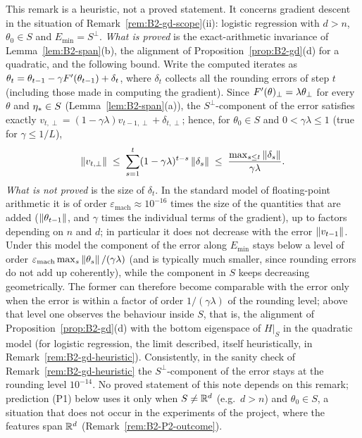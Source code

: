 \begin{remark}\label{rem:B2-gd-rounding}
This remark is a heuristic, not a proved statement. It concerns gradient descent in the situation of
Remark~\ref{rem:B2-gd-scope}(ii): logistic regression with $d>n$, $\theta_0\in S$ and $E_{\min}=S^\perp$. \emph{What is
proved} is the exact-arithmetic invariance of Lemma~\ref{lem:B2-span}(b), the alignment of Proposition~\ref{prop:B2-gd}(d)
for a quadratic, and the following bound. Write the computed iterates as
$\theta_t=\theta_{t-1}-\gamma F'(\theta_{t-1})+\delta_t$, where $\delta_t$ collects all the rounding errors of step $t$
(including those made in computing the gradient). Since $F'(\theta)_\perp=\lambda\theta_\perp$ for every $\theta$ and
$\eta_\ast\in S$ (Lemma~\ref{lem:B2-span}(a)), the $S^\perp$-component of the error satisfies exactly
$v_{t,\perp}=(1-\gamma\lambda)v_{t-1,\perp}+\delta_{t,\perp}$; hence, for $\theta_0\in S$ and $0<\gamma\lambda\le1$ (true for
$\gamma\le1/L$),
\[
\left\|v_{t,\perp}\right\|\;\le\;\sum_{s=1}^t(1-\gamma\lambda)^{t-s}\left\|\delta_s\right\|\;\le\;\frac{\max_{s\le t}\left\|\delta_s\right\|}{\gamma\lambda} .
\]
\emph{What is not proved} is the size of $\delta_t$. In the standard model of floating-point arithmetic it is of order
$\varepsilon_{\mathrm{mach}}\approx10^{-16}$ times the size of the quantities that are added ($\left\|\theta_{t-1}\right\|$, and
$\gamma$ times the individual terms of the gradient), up to factors depending on $n$ and $d$; in particular it does not
decrease with the error $\left\|v_{t-1}\right\|$. Under this model the component of the error along $E_{\min}$ stays below a level
of order $\varepsilon_{\mathrm{mach}}\max_s\left\|\theta_s\right\|/(\gamma\lambda)$ (and is typically much smaller, since rounding
errors do not add up coherently), while the component in $S$ keeps decreasing geometrically. The former can therefore
become comparable with the error only when the error is within a factor of order $1/(\gamma\lambda)$ of the rounding
level; above that level one observes the behaviour inside $S$, that is, the alignment of
Proposition~\ref{prop:B2-gd}(d) with the bottom eigenspace of $H|_S$ in the quadratic model (for logistic regression, the
limit described, itself heuristically, in Remark~\ref{rem:B2-gd-heuristic}). Consistently, in the sanity check of
Remark~\ref{rem:B2-gd-heuristic} the $S^\perp$-component of the error stays at the rounding level $10^{-14}$. No proved
statement of this note depends on this remark; prediction (P1) below uses it only when $S\neq\mathbb{R}^d$ (e.g.\ $d>n$) and
$\theta_0\in S$, a situation that does not occur in the experiments of the project, where the features span $\mathbb{R}^d$
(Remark~\ref{rem:B2-P2-outcome}).
\end{remark}

